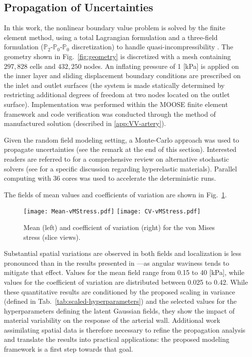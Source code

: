 \subsection{Propagation of Uncertainties}\label{subsec:SFEM-propagation}

In this work, the nonlinear boundary value problem is solved by the finite element method, using a total Lagrangian formulation and a three-field formulation ($\mathbb{P}_2$-$\mathbb{P}_0$-$\mathbb{P}_0$ discretization) to handle quasi-incompressibility \cite{wriggers2008nonlinear}. The geometry shown in Fig.~\ref{fig:geometry} is discretized with a mesh containing $297,828$ cells and $432,250$ nodes. An inflating pressure of 1 [kPa] is applied on the inner layer and sliding displacement boundary conditions are prescribed on the inlet and outlet surfaces (the system is made statically determined by restricting additional degrees of freedom at two nodes located on the outlet surface). Implementation was performed within the MOOSE finite element framework \cite{permann2020moose} and code verification was conducted through the method of manufactured solution (described in \ref{app:VV-artery}).  

Given the random field modeling setting, a Monte-Carlo approach was used to propagate uncertainties (see the remark at the end of this section). Interested readers are referred to \cite{Ghanem2017} for a comprehensive review on alternative stochastic solvers (see \cite{hauseux2018quantifying} for a specific discussion regarding hyperelastic materials). Parallel computing with 36 cores was used to accelerate the deterministic runs.

The fields of mean values and coefficients of variation are shown in Fig.~\ref{fig:vonMises}.
\begin{figure}[ht!]
    \begin{center}
        \texttt{[image: Mean-vMStress.pdf]} \texttt{[image: CV-vMStress.pdf]}
    \end{center}
    \caption[Mean and coefficient of variation for the von Mises stress.]{Mean (left) and coefficient of variation (right) for the von Mises stress (slice views).}
    \label{fig:vonMises}
\end{figure}
Substantial spatial variations are observed in both fields and localization is less pronounced than in the results presented in \cite{STABER201894}---as angular waviness tends to mitigate that effect. Values for the mean field range from 0.15 to 40 [kPa], while values for the coefficient of variation are distributed between 0.025 to 0.42. While these quantitative results are conditioned by the proposed scaling in variance (defined in Tab.~\ref{tab:scaled-hyperparameters}) and the selected values for the hyperparameters defining the latent Gaussian fields, they show the impact of material variability on the response of the arterial wall. Additional work assimilating spatial data is therefore necessary to refine the propagation analysis and translate the results into practical applications: the proposed modeling framework is a first step towards that goal.

